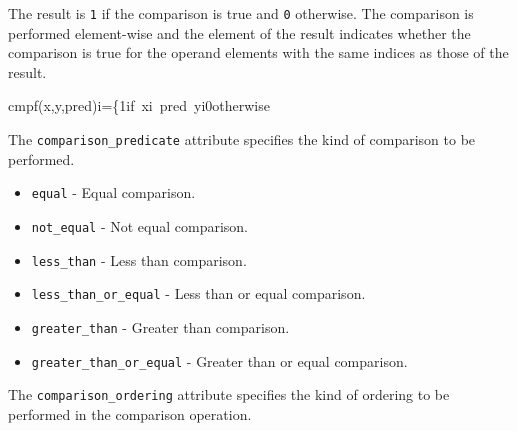 \documentclass{article}
\begin{document}
The result is \texttt{1} if the comparison is true and \texttt{0} otherwise. The comparison is performed element-wise and the element of the result indicates whether the comparison is true for the operand elements with the same indices as those of the result.


cmpf(x,y,pred)i=\{1if xi pred yi0otherwise

The \texttt{comparison\_predicate} attribute specifies the kind of comparison to be performed.


\begin{itemize}
\item \texttt{equal} - Equal comparison.
\item \texttt{not\_equal} - Not equal comparison.
\item \texttt{less\_than} - Less than comparison.
\item \texttt{less\_than\_or\_equal} - Less than or equal comparison.
\item \texttt{greater\_than} - Greater than comparison.
\item \texttt{greater\_than\_or\_equal} - Greater than or equal comparison.

\end{itemize}
The \texttt{comparison\_ordering} attribute specifies the kind of ordering to be performed in the comparison operation.
\end{document}
